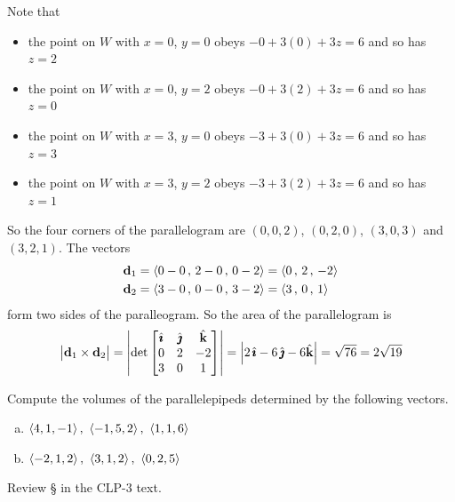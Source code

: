 \begin{solution}
Note that 
\begin{itemize}
   \item the point on $W$ with $x=0$, $y=0$ obeys 
                         $-0+3(0)+3z=6$ and so has $z=2$
   \item the point on $W$ with $x=0$, $y=2$ obeys 
                         $-0+3(2)+3z=6$ and so has $z=0$
   \item the point on $W$ with $x=3$, $y=0$ obeys 
                         $-3+3(0)+3z=6$ and so has $z=3$
   \item the point on $W$ with $x=3$, $y=2$ obeys 
                         $-3+3(2)+3z=6$ and so has $z=1$
\end{itemize}
So the four corners of the parallelogram are 
$(0,0,2)$, $(0,2,0)$, $(3,0,3)$ and $(3,2,1)$. The vectors
\begin{align*}
\mathbf{d}_1&=\left< 0-0 \,,\, 2-0 \,,\, 0-2 \right> = \left< 0 \,,\, 2 \,,\, -2\right> \\
\mathbf{d}_2&=\left< 3-0 \,,\, 0-0 \,,\, 3-2 \right> = \left< 3 \,,\, 0 \,,\, 1\right> 
\end{align*}
form two sides of the paralleogram. So the area of the parallelogram is
\begin{align*}
\big|\mathbf{d}_1\times\mathbf{d}_2\big| 
=\left|\det\left[\begin{matrix}
                     \hat{\pmb{\imath}} & \hat{\pmb{\jmath}} & \hat{\mathbf{k}} \\
                     0   &  2  & -2 \\
                     3   &  0  &  1
                \end{matrix}\right]\right|
=\left| 2\,\hat{\pmb{\imath}} - 6\,\hat{\pmb{\jmath}} -6\hat{\mathbf{k}}  \right|
=\sqrt{76}
=2\sqrt{19}
\end{align*}

\end{solution}

\begin{question}
Compute the volumes of the parallelepipeds determined by the
following vectors.
\begin{enumerate}[(a)]
\item
 $\llt 4,1,-1\rgt,\ \llt -1,5,2\rgt,\ \llt 1,1,6\rgt$ 
\item
  $\llt -2,1,2\rgt,\ \llt 3,1,2\rgt,\ \llt 0,2,5\rgt$
\end{enumerate}
\end{question}

\begin{hint}
Review \S{} in the CLP-3 text.
\end{hint}

